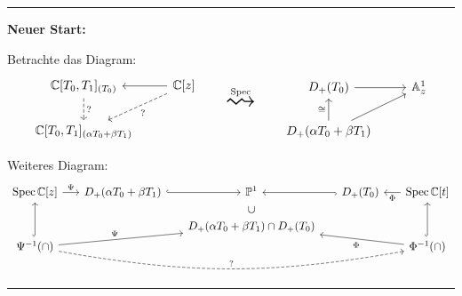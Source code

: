 \begin{center} \rule{0.7\textwidth}{0.4pt} \end{center}

\textbf{Neuer Start:}
\begin{comment}
Frage: Welche Automorphismen hat man auf $D_+(T_0)$ oder $\A_z^1$?\\
Antwort: \TODO
\end{comment}

Betrachte das Diagram:
\[
\begin{tikzcd}
\C[T_0,T_1]_{(T_0)} \dar[dashed]{?}
& \C[z] \lar \arrow[dashed]{ld}{?}
\\
\C[T_0,T_1]_{(\alpha T_0+\beta T_1)}
\end{tikzcd}
\qquad\overset{\Spec}{\text{\Huge$\rightsquigarrow$}}\qquad
\begin{tikzcd}
D_+(T_0) \rar
& \A_z^1
\\
D_+(\alpha T_0+\beta T_1) \uar{\cong} \arrow{ur}
\end{tikzcd}
\]

Weiteres Diagram:
\[
\begin{tikzcd}[row sep=0,column sep=1.5em]
\Spec \C[z] \rar{\Psi}
  & D_+(\alpha T_0+\beta T_1) \rar[hook]
  & \P^1 
  & D_+(T_0) \lar[hook]
  & \Spec \C[t] \lar{\Phi}
\\ && \cup
\\ 
&& D_+(\alpha T_0+\beta T_1) \cap D_+(T_0)
\\
\Psi^{-1}(\cap) \ar[hook]{uuu} \ar{rru}{\Psi} \ar[bend right=10,dashed]{rrrr}{?}
& & & &
\Phi^{-1}(\cap) \ar[hook]{uuu} \ar{llu}{\Phi}
\end{tikzcd}
\]

\begin{center} \rule{0.7\textwidth}{0.4pt} \end{center}

